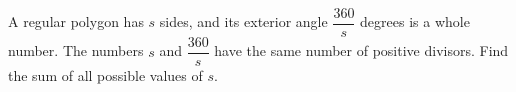 A regular polygon has $s$ sides, and its exterior angle $\dfrac{360}{s}$ degrees is a whole number. The numbers $s$ and $\dfrac{360}{s}$ have the same number of positive divisors. Find the sum of all possible values of $s$.

